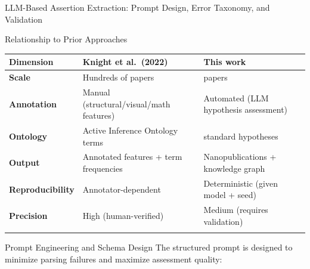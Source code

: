 \documentclass[
  ignorenonframetext,
]{beamer}
\newcounter{none} %
\begin{document}
\begin{frame}[fragile]{LLM-Based Assertion Extraction: Prompt Design,
Error Taxonomy, and Validation \label{sec:extraction_pipeline}}
\begin{block}{Relationship to Prior Approaches}
{\def\LTcaptype{none} %
\begin{longtable}[]{@{}
  >{\raggedright\arraybackslash}p{}
  >{\raggedright\arraybackslash}p{}
  >{\raggedright\arraybackslash}p{}@{}}
\toprule\noalign{}
\begin{minipage}[b]{\linewidth}\raggedright
Dimension
\end{minipage} & \begin{minipage}[b]{\linewidth}\raggedright
Knight et al.~(2022)
\end{minipage} & \begin{minipage}[b]{\linewidth}\raggedright
This work
\end{minipage} \\
\midrule\noalign{}
\endhead
\textbf{Scale} & Hundreds of papers & 785 papers \\
\textbf{Annotation} & Manual (structural/visual/math features) &
Automated (LLM hypothesis assessment) \\
\textbf{Ontology} & Active Inference Ontology terms & 8 standard
hypotheses \\
\textbf{Output} & Annotated features + term frequencies &
Nanopublications + knowledge graph \\
\textbf{Reproducibility} & Annotator-dependent & Deterministic (given
model + seed) \\
\textbf{Precision} & High (human-verified) & Medium (requires
validation) \\
\bottomrule\noalign{}
\end{longtable}
}
\end{block}

\begin{block}{Prompt Engineering and Schema Design}
\protect{}\label{prompt-engineering-and-schema-design}
The structured prompt is designed to minimize parsing failures and
maximize assessment quality:


\end{block}
\end{frame}
\end{document}
